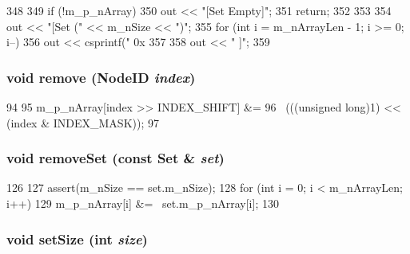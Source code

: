 \begin{DoxyCode}
348 {
349     if (!m_p_nArray) {
350         out << "[Set {Empty}]";
351         return;
352     }
353 
354     out << "[Set (" << m_nSize << ")";
355     for (int i = m_nArrayLen - 1; i >= 0; i--) {
356         out << csprintf(" 0x%
357     }
358     out << " ]";
359 }
\end{DoxyCode}
\hypertarget{classSet_a1c1436bbfbdadb662db0fa20bfd8cc8b}{
\subsubsection[{remove}]{\setlength{\rightskip}{0pt plus 5cm}void remove ({\bf NodeID} {\em index})}}
\label{classSet_a1c1436bbfbdadb662db0fa20bfd8cc8b}



\begin{DoxyCode}
94     {
95         m_p_nArray[index >> INDEX_SHIFT] &=
96             ~(((unsigned long)1) << (index & INDEX_MASK));
97     }
\end{DoxyCode}
\hypertarget{classSet_ab66a463aa908331ff43ccb847213b07c}{
\subsubsection[{removeSet}]{\setlength{\rightskip}{0pt plus 5cm}void removeSet (const {\bf Set} \& {\em set})}}
\label{classSet_ab66a463aa908331ff43ccb847213b07c}



\begin{DoxyCode}
126 {
127     assert(m_nSize == set.m_nSize);
128     for (int i = 0; i < m_nArrayLen; i++)
129         m_p_nArray[i] &= ~set.m_p_nArray[i];
130 }
\end{DoxyCode}
\hypertarget{classSet_a72020e2e3721c814d7a5ff1dac539484}{
\subsubsection[{setSize}]{\setlength{\rightskip}{0pt plus 5cm}void setSize (int {\em size})}}
\label{classSet_a72020e2e3721c814d7a5ff1dac539484}



